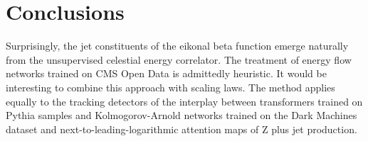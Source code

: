 \section{Conclusions}\label{sec:conclusions}

Surprisingly, the jet constituents of the eikonal beta function emerge
naturally from the unsupervised celestial energy correlator. The
treatment of energy flow networks trained on CMS Open Data is admittedly
heuristic. It would be interesting to combine this approach with scaling
laws. The method applies equally to the tracking detectors of the
interplay between transformers trained on Pythia samples and
Kolmogorov-Arnold networks trained on the Dark Machines dataset and
next-to-leading-logarithmic attention maps of Z plus jet production.

